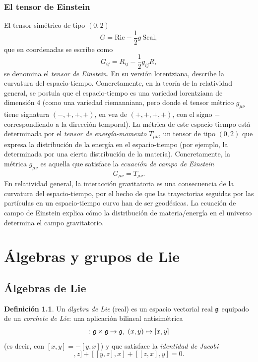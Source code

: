 \documentclass[11pt,a4paper]{amsbook}
\theoremstyle{remark} \newtheorem{rmk}[subsection]{Observación}
\theoremstyle{definition} \newtheorem{defn}[subsection]{Definición}
\theoremstyle{definition} \newtheorem{ex}[subsection]{Ejemplo}
\theoremstyle{definition} \newtheorem{ej}[subsection]{Ejercicio}
\begin{document}
\subsection{El tensor de Einstein} El tensor simétrico de tipo $(0,2)$
\begin{equation*}
G = \mathrm{Ric} - \frac{1}{2} g\ \mathrm{Scal},
\end{equation*}
que en coordenadas se escribe como
\begin{equation*}
G_{ij} = R_{ij} - \frac{1}{2} g_{ij} R,
\end{equation*}
se denomina el \emph{tensor de Einstein}. En su versión lorentziana, describe la curvatura del espacio-tiempo. Concretamente, en la teoría de la relatividad general, se postula que el espacio-tiempo es una variedad lorentziana de dimensión 4 (como una variedad riemanniana, pero donde el tensor métrico $g_{\mu\nu}$ tiene signatura $(-,+,+,+)$, en vez de $(+,+,+,+)$, con el signo $-$ correspondiendo a la dirección temporal). La métrica de este espacio tiempo está determinada por el \emph{tensor de energía-momento} $T_{\mu\nu}$, un tensor de tipo $(0,2)$ que expresa la distribución de la energía en el espacio-tiempo (por ejemplo, la determinada por una cierta distribución de la materia). Concretamente, la métrica $g_{\mu\nu}$ es aquella que satisface la \emph{ecuación de campo de Einstein}
\begin{equation*}
G_{\mu\nu} = T_{\mu\nu}.
\end{equation*}
En relatividad general, la interacción gravitatoria es una consecuencia de la curvatura del espacio-tiempo, por el hecho de que las trayectorias seguidas por las partículas en un espacio-tiempo curvo han de ser geodésicas. La ecuación de campo de Einstein explica cómo la distribución de materia/energía en el universo determina el campo gravitatorio.

\chapter{Álgebras y grupos de Lie}

\section{Álgebras de Lie}
\begin{defn}
  Un \emph{álgebra de Lie} (real) es un espacio vectorial real $\mathfrak{g}$ equipado de un \emph{corchete de Lie}: una aplicación bilineal antisimétrica
  \begin{equation*}
[-,-]: \fg \times \fg \rightarrow \fg, \ (x,y)\mapsto [x,y]
  \end{equation*}
(es decir, con $[x,y]=-[y,x]$) y que satisface la \emph{identidad de Jacobi}
\begin{equation*}
[[x,y],z] + [[y,z],x] + [[z,x], y] = 0.
\end{equation*}
\end{defn}
\end{document}
